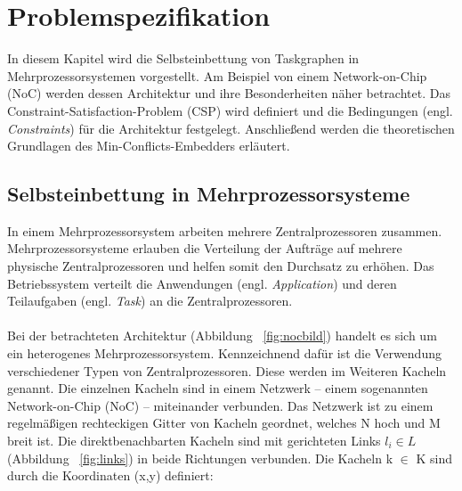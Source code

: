 \chapter{Problemspezifikation}\label{problemspezifikation}

In diesem Kapitel wird die Selbsteinbettung von Taskgraphen in Mehrprozessorsystemen vorgestellt. Am Beispiel von einem Network-on-Chip (NoC) werden dessen Architektur und ihre Besonderheiten näher betrachtet. Das Constraint-Satisfaction-Problem (CSP) wird definiert und die Bedingungen (engl. \textit{Constraints}) für die Architektur festgelegt. Anschließend werden die theoretischen Grundlagen des Min-Conflicts-Embedders erläutert.

\section{Selbsteinbettung in Mehrprozessorsysteme}
In einem Mehrprozessorsystem \cite{Mehrprozessorsysteme} arbeiten mehrere Zentralprozessoren zusammen. 
Mehrprozessorsysteme erlauben die Verteilung der Aufträge auf mehrere physische Zentralprozessoren und helfen somit den Durchsatz zu erhöhen. Das Betriebssystem verteilt die Anwendungen (engl. \textit{Application}) und deren Teilaufgaben (engl. \textit{Task}) an die Zentralprozessoren.  \\%
 


\ \\
Bei der betrachteten Architektur (Abbildung ~\ref{fig:nocbild}) handelt es sich um ein heterogenes Mehrprozessorsystem. Kennzeichnend dafür ist die Verwendung verschiedener Typen von Zentralprozessoren. Diese werden im Weiteren Kacheln genannt. Die einzelnen Kacheln sind in einem Netzwerk -- einem sogenannten Network-on-Chip (NoC) \cite{mappingNocArchitectures} \cite{NOC} -- miteinander verbunden. Das Netzwerk ist zu einem regelmäßigen rechteckigen Gitter von Kacheln geordnet, welches N hoch und M breit ist. Die direktbenachbarten Kacheln sind mit gerichteten Links  $l_i \in L$ (Abbildung ~\ref{fig:links}) in beide Richtungen verbunden. Die Kacheln k $\in$ K sind durch die Koordinaten (x,y) definiert:

